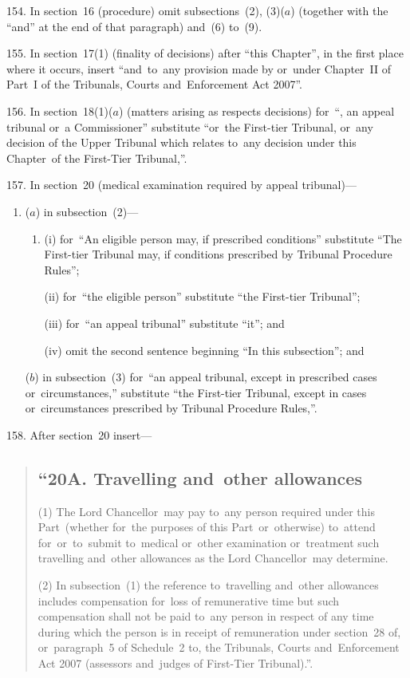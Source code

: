 \documentclass[12pt,a4paper]{article}
\begin{document}
\medskip

154.  In section~16 (procedure) omit subsections~(2), (3)($a$)  (together with the “and” at the end of that paragraph) and~(6) to~(9).

\medskip

155.  In section~17(1) (finality of decisions) after “this Chapter”, in the first place where it occurs, insert “and~to~any provision made by or~under Chapter~II of Part~I of the Tribunals, Courts and~Enforcement Act 2007”.

\medskip

156.  In section~18(1)($a$)  (matters arising as respects decisions) for~“, an appeal tribunal or~a Commissioner” substitute “or~the First-tier Tribunal, or~any decision of the Upper Tribunal which relates to~any decision under this Chapter~of the First-Tier Tribunal,”.

\medskip

157.  In section~20 (medical examination required by appeal tribunal)—
\begin{enumerate}\item[]
($a$) in subsection~(2)—
\begin{enumerate}\item[]
(i) for~“An eligible person may, if prescribed conditions” substitute “The First-tier Tribunal may, if conditions prescribed by Tribunal Procedure Rules”;

(ii) for~“the eligible person” substitute “the First-tier Tribunal”;

(iii) for~“an appeal tribunal” substitute “it”; and

(iv)  omit the second sentence beginning “In this subsection”; and
\end{enumerate}

($b$) in subsection~(3) for~“an appeal tribunal, except in prescribed cases or~circumstances,” substitute “the First-tier Tribunal, except in cases or~circumstances prescribed by Tribunal Procedure Rules,”.
\end{enumerate}

\medskip

158.  After section~20 insert—
\begin{quotation}
\subsection*{“20A.  Travelling and~other allowances}

(1) The Lord Chancellor~may pay to~any person required under this Part~(whether for~the purposes of this Part~or~otherwise) to~attend for~or~to~submit to~medical or~other examination or~treatment such travelling and~other allowances as the Lord Chancellor~may determine.

(2) In subsection~(1) the reference to~travelling and~other allowances includes compensation for~loss of remunerative time but such compensation shall not be paid to~any person in respect of any time during which the person is in receipt of remuneration under section~28 of, or~paragraph~5 of Schedule~2 to, the Tribunals, Courts and~Enforcement Act 2007 (assessors and~judges of First-Tier Tribunal).”.
\end{quotation}
\end{document}
